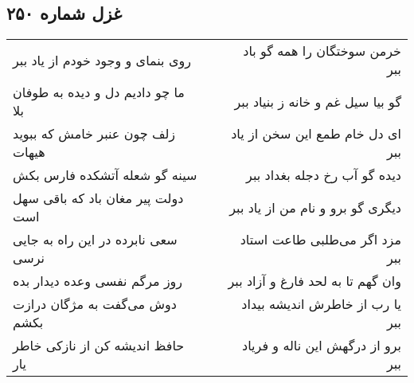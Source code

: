 \begin{center}
\section*{غزل شماره ۲۵۰}
\label{sec:sh250}
\begin{longtable}{l p{0.5cm} r}
روی بنمای و وجود خودم از یاد ببر
&&
خرمن سوختگان را همه گو باد ببر
\\
ما چو دادیم دل و دیده به طوفان بلا
&&
گو بیا سیل غم و خانه ز بنیاد ببر
\\
زلف چون عنبر خامش که ببوید هیهات
&&
ای دل خام طمع این سخن از یاد ببر
\\
سینه گو شعله آتشکده فارس بکش
&&
دیده گو آب رخ دجله بغداد ببر
\\
دولت پیر مغان باد که باقی سهل است
&&
دیگری گو برو و نام من از یاد ببر
\\
سعی نابرده در این راه به جایی نرسی
&&
مزد اگر می‌طلبی طاعت استاد ببر
\\
روز مرگم نفسی وعده دیدار بده
&&
وان گهم تا به لحد فارغ و آزاد ببر
\\
دوش می‌گفت به مژگان درازت بکشم
&&
یا رب از خاطرش اندیشه بیداد ببر
\\
حافظ اندیشه کن از نازکی خاطر یار
&&
برو از درگهش این ناله و فریاد ببر
\\
\end{longtable}
\end{center}
